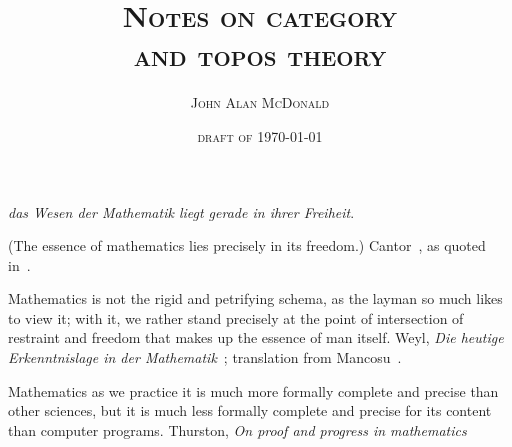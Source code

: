 \documentclass[11pt,openany]{book}
\title{\textsc{Notes on category \\ and topos theory}}
\author{\textsc{John Alan McDonald}}
\date{\textsc{draft of \today}}
\begin{document}
\maketitle
\setcounter{baseSectionLevel}{6}
\frontmatter
\pagestyle{front}
\begingroup
\let\onecolumn\twocolumn
\scshape
\tableofcontents
\upshape
\endgroup
\clearpage
\mainmatter
\pagestyle{plain}
\setcounter{currentlevel}{\value{baseSectionLevel}}
\label{sec:Preface}
\label{sec:2020-08}

\begin{boxquote}
\textsl{das Wesen der Mathematik liegt gerade in ihrer Freiheit}.
\par
(The essence of mathematics lies precisely in its freedom.)
\tcblower
{Cantor~\cite{Cantor1883},
as quoted in~\cite{ferreiros2007labyrinth}.}
\end{boxquote}

\begin{boxquote}
Mathematics is not the rigid and petrifying schema, 
as the layman so much likes to view it; with it,
 we rather stand precisely at the point of intersection 
 of restraint and freedom that makes up the essence of man itself.
\tcblower
{Weyl, 
\textit{Die heutige Erkenntnislage in der Mathematik}~\cite{weyl1926heutige};
translation from Mancosu~\cite{mancosu1998brouwer}.}
\end{boxquote}

\begin{boxquote}
Mathematics as we practice it is much more formally 
complete and precise than
other sciences, but it is much less formally complete and precise 
for its content than computer programs.
\tcblower
{Thurston, 
\textit{On proof and progress in mathematics
}~\cite{thurston_1994_proof}}
\end{boxquote}
\end{document}

